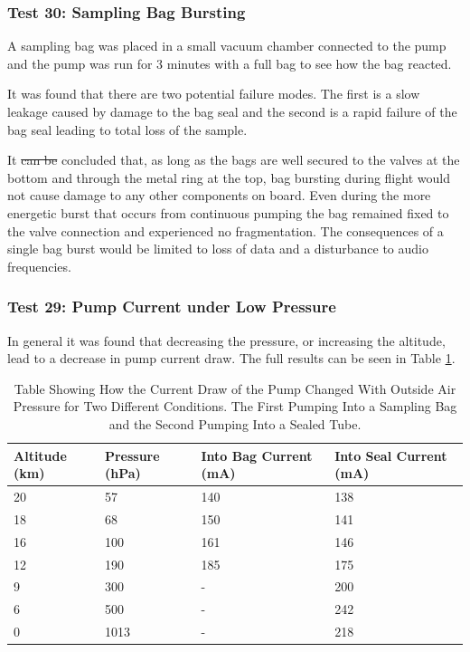 \documentclass[a4paper,12pt,oneside]{article}
\providecommand{\DIFaddtex}[1]{{\protect\color{blue}\uwave{#1}}} %
\providecommand{\DIFdeltex}[1]{{\protect\color{red}\sout{#1}}}                      %
\providecommand{\DIFaddbegin}{} %
\providecommand{\DIFaddend}{} %
\providecommand{\DIFdelbegin}{} %
\providecommand{\DIFdelend}{} %
\providecommand{\DIFadd}[1]{\texorpdfstring{\DIFaddtex{#1}}{#1}} %
\providecommand{\DIFdel}[1]{\texorpdfstring{\DIFdeltex{#1}}{}} %
\newcommand{\DIFscaledelfig}{0.5}
\newlength{\DIFdelgraphicswidth} %
\newlength{\DIFdelgraphicsheight} %
\newcommand{\DIFaddincludegraphics}[2][]{{\color{blue}\fbox{\DIFOincludegraphics[#1]{#2}}}} %
\newcommand{\DIFdelincludegraphics}[2][]{%
\sbox{\DIFdelgraphicsbox}{\DIFOincludegraphics[#1]{#2}}%
\settoboxwidth{\DIFdelgraphicswidth}{\DIFdelgraphicsbox} %
\settoboxtotalheight{\DIFdelgraphicsheight}{\DIFdelgraphicsbox} %
\scalebox{\DIFscaledelfig}{%
\parbox[b]{\DIFdelgraphicswidth}{\usebox{\DIFdelgraphicsbox}\\[-\baselineskip] \rule{\DIFdelgraphicswidth}{0em}}\llap{\resizebox{\DIFdelgraphicswidth}{\DIFdelgraphicsheight}{%
\setlength{\unitlength}{\DIFdelgraphicswidth}%
\begin{picture}(1,1)%
\thicklines\linethickness{2pt} %
{\color[rgb]{1,0,0}\put(0,0){\framebox(1,1){}}}%
{\color[rgb]{1,0,0}\put(0,0){\line( 1,1){1}}}%
{\color[rgb]{1,0,0}\put(0,1){\line(1,-1){1}}}%
\end{picture}%
}\hspace*{3pt}}} %
} %
\DeclareRobustCommand{\DIFaddbegin}{\DIFOaddbegin \let\includegraphics\DIFaddincludegraphics} %
\DeclareRobustCommand{\DIFaddend}{\DIFOaddend \let\includegraphics\DIFOincludegraphics} %
\DeclareRobustCommand{\DIFdelbegin}{\DIFOdelbegin \let\includegraphics\DIFdelincludegraphics} %
\DeclareRobustCommand{\DIFdelend}{\DIFOaddend \let\includegraphics\DIFOincludegraphics} %
\begin{document}
\subsubsection{Test 30: Sampling Bag Bursting}
\label{sec:test30result}

A sampling bag was placed in a small vacuum chamber connected to the pump and the pump was run for 3 minutes with a full bag to see how the bag reacted. 

It was found that there are two potential failure modes. The first is a slow leakage caused by damage to the bag seal and the second is  a rapid failure of the bag seal leading to total loss of the sample.

It \DIFdelbegin \DIFdel{can be }\DIFdelend \DIFaddbegin \DIFadd{was }\DIFaddend concluded that, as long as the bags are well secured to the valves at the bottom and through the metal ring at the top, bag bursting during flight would not cause damage to any other components on board. Even during the more energetic burst that occurs from continuous pumping the bag remained fixed to the valve connection and experienced no fragmentation. The consequences of a single bag burst would be limited to loss of data and a disturbance to audio frequencies. 

\subsubsection{Test 29: Pump Current under Low Pressure}
\label{sec:test29result}

In general it was found that decreasing the pressure, or increasing the altitude, lead to a decrease in pump current draw. The full results can be seen in Table \ref{tab:pumpcurrentpressure}. 

\begin{table}[H]
\centering

\begin{tabular}{|l|l|l|l|}
\hline
\textbf{Altitude (km)} & \textbf{Pressure (hPa)} & \textbf{Into Bag Current (mA)} & \textbf{Into Seal Current (mA)} \\ \hline
20 & 57 & 140 & 138 \\ \hline
18 & 68 & 150 & 141 \\ \hline
16 & 100 & 161 & 146 \\ \hline
12 & 190 & 185 & 175 \\ \hline
9 & 300 & - & 200 \\ \hline
6 & 500 & - & 242 \\ \hline
0 & 1013 & - & 218 \\ \hline
\end{tabular}
\caption{Table Showing How the Current Draw of the Pump Changed With Outside Air Pressure for Two Different Conditions. The First Pumping Into a Sampling Bag and the Second Pumping Into a Sealed Tube.}
\label{tab:pumpcurrentpressure}
\end{table}
\end{document}
